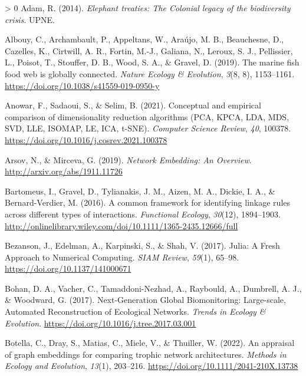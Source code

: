 \documentclass[10pt,oneside]{article}
\newlength{\cslhangindent}
\newenvironment{CSLReferences}[3] %
 {%
  \setlength{\parindent}{0pt}
  \ifodd #1 \everypar{\setlength{\hangindent}{\cslhangindent}}\ignorespaces\fi
  \ifnum #2 > 0
  \setlength{\parskip}{#2\baselineskip}
  \fi
 }%
 {}
\begin{document}
\hypertarget{refs}{}
\begin{CSLReferences}{1}{0}
\leavevmode\hypertarget{ref-Adam2014EleTre}{}%
Adam, R. (2014). \emph{Elephant treaties: The Colonial legacy of the
biodiversity crisis}. UPNE.

\leavevmode\hypertarget{ref-Albouy2019MarFis}{}%
Albouy, C., Archambault, P., Appeltans, W., Araújo, M. B., Beauchesne,
D., Cazelles, K., Cirtwill, A. R., Fortin, M.-J., Galiana, N., Leroux,
S. J., Pellissier, L., Poisot, T., Stouffer, D. B., Wood, S. A., \&
Gravel, D. (2019). The marine fish food web is globally connected.
\emph{Nature Ecology \& Evolution}, \emph{3}(8, 8), 1153--1161.
\url{https://doi.org/10.1038/s41559-019-0950-y}

\leavevmode\hypertarget{ref-Anowar2021ConEmp}{}%
Anowar, F., Sadaoui, S., \& Selim, B. (2021). Conceptual and empirical
comparison of dimensionality reduction algorithms (PCA, KPCA, LDA, MDS,
SVD, LLE, ISOMAP, LE, ICA, t-SNE). \emph{Computer Science Review},
\emph{40}, 100378. \url{https://doi.org/10.1016/j.cosrev.2021.100378}

\leavevmode\hypertarget{ref-Arsov2019NetEmb}{}%
Arsov, N., \& Mirceva, G. (2019). \emph{Network Embedding: An Overview}.
\url{http://arxiv.org/abs/1911.11726}

\leavevmode\hypertarget{ref-Bartomeus2016ComFra}{}%
Bartomeus, I., Gravel, D., Tylianakis, J. M., Aizen, M. A., Dickie, I.
A., \& Bernard-Verdier, M. (2016). A common framework for identifying
linkage rules across different types of interactions. \emph{Functional
Ecology}, \emph{30}(12), 1894--1903.
\url{http://onlinelibrary.wiley.com/doi/10.1111/1365-2435.12666/full}

\leavevmode\hypertarget{ref-Bezanson2017JulFre}{}%
Bezanson, J., Edelman, A., Karpinski, S., \& Shah, V. (2017). Julia: A
Fresh Approach to Numerical Computing. \emph{SIAM Review}, \emph{59}(1),
65--98. \url{https://doi.org/10.1137/141000671}

\leavevmode\hypertarget{ref-Bohan2017NexGlo}{}%
Bohan, D. A., Vacher, C., Tamaddoni-Nezhad, A., Raybould, A., Dumbrell,
A. J., \& Woodward, G. (2017). Next-Generation Global Biomonitoring:
Large-scale, Automated Reconstruction of Ecological Networks.
\emph{Trends in Ecology \& Evolution}.
\url{https://doi.org/10.1016/j.tree.2017.03.001}

\leavevmode\hypertarget{ref-Botella2022AppGra}{}%
Botella, C., Dray, S., Matias, C., Miele, V., \& Thuiller, W. (2022). An
appraisal of graph embeddings for comparing trophic network
architectures. \emph{Methods in Ecology and Evolution}, \emph{13}(1),
203--216. \url{https://doi.org/10.1111/2041-210X.13738}


\end{CSLReferences}
\end{document}
